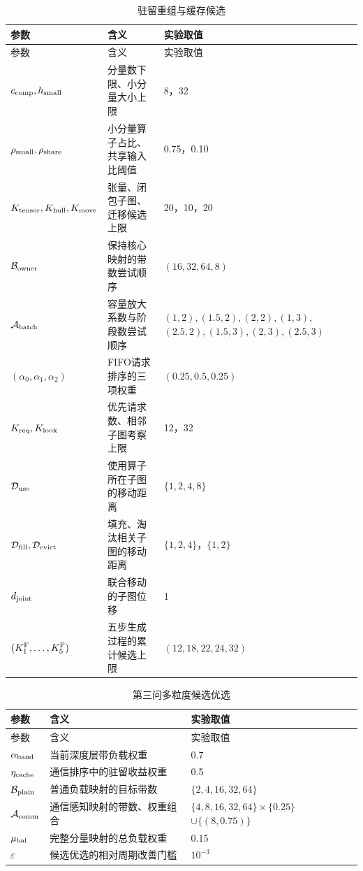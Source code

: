 \begingroup\small
\setlength{\tabcolsep}{4pt}
\setlength{\LTleft}{0pt}\setlength{\LTright}{0pt}
\begin{longtable}{@{}p{36mm}p{57mm}p{59mm}@{}}
\caption{驻留重组与缓存候选}\label{tab:parameters_residency}\\
\toprule
参数 & 含义 & 实验取值\\
\midrule
\endfirsthead
\toprule
参数 & 含义 & 实验取值\\
\midrule
\endhead
\bottomrule
\endfoot
$c_{\rm comp},h_{\rm small}$ & 分量数下限、小分量大小上限 & 8，32\\
$\rho_{\rm small},\rho_{\rm share}$ & 小分量算子占比、共享输入比阈值 & 0.75，0.10\\
$K_{\rm tensor},K_{\rm hull},K_{\rm move}$ & 张量、闭包子图、迁移候选上限 & 20，10，20\\
$\mathcal B_{\rm owner}$ & 保持核心映射的带数尝试顺序 & $(16,32,64,8)$\\
$\mathcal A_{\rm batch}$ & 容量放大系数与阶段数尝试顺序 & $(1,2),(1.5,2),(2,2),(1,3),$\newline$(2.5,2),(1.5,3),(2,3),(2.5,3)$\\
$(\alpha_0,\alpha_1,\alpha_2)$ & FIFO请求排序的三项权重 & $(0.25,0.5,0.25)$\\
$K_{\rm req},K_{\rm look}$ & 优先请求数、相邻子图考察上限 & 12，32\\
$\mathcal D_{\rm use}$ & 使用算子所在子图的移动距离 & $\{1,2,4,8\}$\\
$\mathcal D_{\rm fill},\mathcal D_{\rm evict}$ & 填充、淘汰相关子图的移动距离 & $\{1,2,4\}$，$\{1,2\}$\\
$d_{\rm joint}$ & 联合移动的子图位移 & 1\\
$(K^{\rm F}_1,\ldots,K^{\rm F}_5)$ & 五步生成过程的累计候选上限 & $(12,18,22,24,32)$\\
\end{longtable}\endgroup

\begingroup\small
\setlength{\tabcolsep}{4pt}
\setlength{\LTleft}{0pt}\setlength{\LTright}{0pt}
\begin{longtable}{@{}p{36mm}p{57mm}p{59mm}@{}}
\caption{第三问多粒度候选优选}\label{tab:parameters_portfolio}\\
\toprule
参数 & 含义 & 实验取值\\
\midrule
\endfirsthead
\toprule
参数 & 含义 & 实验取值\\
\midrule
\endhead
\bottomrule
\endfoot
$\alpha_{\rm band}$ & 当前深度层带负载权重 & 0.7\\
$\eta_{\rm cache}$ & 通信排序中的驻留收益权重 & 0.5\\
$\mathcal B_{\rm plain}$ & 普通负载映射的目标带数 & $\{2,4,16,32,64\}$\\
$\mathcal A_{\rm comm}$ & 通信感知映射的带数、权重组合 & $\{4,8,16,32,64\}\times\{0.25\}$\newline$\cup\{(8,0.75)\}$\\
$\mu_{\rm bal}$ & 完整分量映射的总负载权重 & 0.15\\
$\varepsilon$ & 候选优选的相对周期改善门槛 & $10^{-3}$\\
\end{longtable}\endgroup

